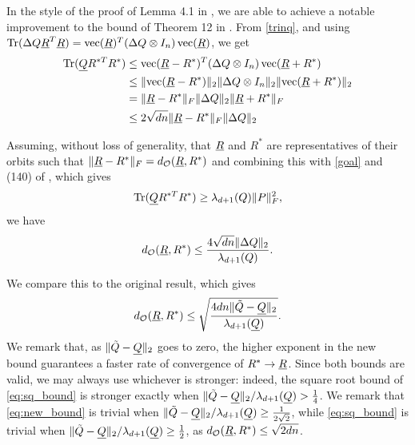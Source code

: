 In the style of the proof of Lemma 4.1 in \cite{bandeira2016tightness}, we are able to achieve a notable improvement to the bound of Theorem 12 in \cite{bandeira2016se_sync}.  From \eqref{trinq}, and using $\operatorname{Tr}(\Delta Q \underline{R}^T \underline{R}) = \operatorname{vec}(\underline{R})^T (\Delta Q \otimes I_n) \operatorname{vec}(\underline{R})$, we get \begin{align*} \operatorname{Tr}(\underline{Q} R^{*T} R^*) &\le \operatorname{vec}(\underline{R} - R^*)^T (\Delta Q \otimes I_n) \operatorname{vec}(\underline{R} + R^*) \\ &\le \lVert\operatorname{vec}(\underline{R} - R^*)\rVert_2 \lVert\Delta Q \otimes I_n\rVert_2 \lVert\operatorname{vec}(\underline{R} + R^*)\rVert_2 \\ &= \lVert\underline{R} - R^*\rVert_F \lVert\Delta Q\rVert_2 \lVert\underline{R} + R^*\rVert_F \\ &\le 2\sqrt{dn} \lVert\underline{R} - R^*\rVert_F \lVert\Delta Q\rVert_2\end{align*}

Assuming, without loss of generality, that $\underline{R}$ and $R^*$ are representatives of their orbits such that $\lVert\underline{R} - R^*\rVert_F = d_{\mathcal{O}}(\underline{R}, R^*)$ and combining this with \eqref{goal} and (140) of \cite{bandeira2016se_sync}, which gives \[\operatorname{Tr}(\underline{Q} R^{*T} R^*) \ge \lambda_{d + 1}(Q) \lVert P\rVert_F^2,\] we have \begin{equation} d_{\mathcal{O}}(\underline{R}, R^*) \le \dfrac{4 \sqrt{dn} \lVert\Delta Q\rVert_2}{\lambda_{d + 1}(Q)}. \label{eq:new_bound}\end{equation}

We compare this to the original result, which gives \begin{equation} d_{\mathcal{O}}(\underline{R}, R^*) \le \sqrt{\dfrac{4 dn \lVert\tilde{Q} - \underline{Q}\rVert_2}{\lambda_{d + 1}(\underline{Q})}}. \label{eq:sq_bound} \end{equation}  We remark that, as $\lVert\tilde{Q} - \underline{Q}\rVert_2$ goes to zero, the higher exponent in the new bound guarantees a faster rate of convergence of $R^* \to \underline{R}$.  Since both bounds are valid, we may always use whichever is stronger: indeed, the square root bound of \eqref{eq:sq_bound} is stronger exactly when $\lVert\tilde{Q} - \underline{Q}\rVert_2 / \lambda_{d + 1}(\underline{Q}) > \frac{1}{4}$.  We remark that \eqref{eq:new_bound} is trivial when $\lVert\tilde{Q} - \underline{Q}\rVert_2 / \lambda_{d + 1}(\underline{Q}) \ge \frac{1}{2 \sqrt{2}}$, while \eqref{eq:sq_bound} is trivial when $\lVert\tilde{Q} - \underline{Q}\rVert_2 / \lambda_{d + 1}(\underline{Q}) \ge \frac{1}{2}$, as $d_{\mathcal{O}}(\underline{R}, R^*) \le \sqrt{2 d n}$.

